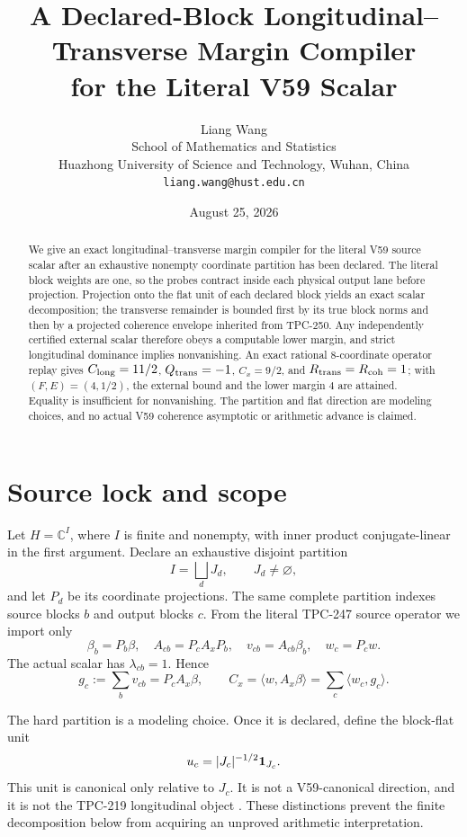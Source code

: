 \documentclass[10pt]{article}
\title{A Declared-Block Longitudinal--Transverse Margin Compiler\\
for the Literal V59 Scalar}
\author{Liang Wang\\
School of Mathematics and Statistics\\
Huazhong University of Science and Technology, Wuhan, China\\
\texttt{liang.wang@hust.edu.cn}}
\date{August 25, 2026}
\newcommand{\C}{\mathbb{C}}
\newcommand{\ip}[2]{\langle #1,#2\rangle}
\begin{document}
\maketitle

\begin{abstract}
We give an exact longitudinal--transverse margin compiler for the literal V59
source scalar after an exhaustive nonempty coordinate partition has been
declared.  The literal block weights are one, so the probes contract inside
each physical output lane before projection.  Projection onto the flat unit
of each declared block yields an exact scalar decomposition; the transverse
remainder is bounded first by its true block norms and then by a projected
coherence envelope inherited from TPC-250.  Any independently certified
external scalar therefore obeys a computable lower margin, and strict
longitudinal dominance implies nonvanishing.  An exact rational
$8$-coordinate operator replay gives
$C_{\rm long}=11/2$, $Q_{\rm trans}=-1$, $C_x=9/2$, and
$R_{\rm trans}=R_{\rm coh}=1$; with $(F,E)=(4,1/2)$, the external bound and
the lower margin $4$ are attained.  Equality is insufficient for
nonvanishing.  The partition and flat direction are modeling choices, and no
actual V59 coherence asymptotic or arithmetic advance is claimed.
\end{abstract}

\section{Source lock and scope}

Let $H=\C^I$, where $I$ is finite and nonempty, with inner product
conjugate-linear in the first argument.  Declare an exhaustive disjoint
partition
\[
 I=\bigsqcup_d J_d, \qquad J_d\ne\varnothing,
\]
and let $P_d$ be its coordinate projections.  The same complete partition
indexes source blocks $b$ and output blocks $c$.  From the literal TPC-247
source operator we import only \cite{tpc247}
\[
 \beta_b=P_b\beta,\quad A_{cb}=P_cA_xP_b,\quad
 v_{cb}=A_{cb}\beta_b,\quad w_c=P_cw.
\]
The actual scalar has $\lambda_{cb}=1$.  Hence
\begin{equation}\label{eq:literal}
 g_c:=\sum_bv_{cb}=P_cA_x\beta,
 \qquad C_x=\ip{w}{A_x\beta}=\sum_c\ip{w_c}{g_c}.
\end{equation}

The hard partition is a modeling choice.  Once it is declared, define the
block-flat unit
\[
 u_c=|J_c|^{-1/2}{\bf 1}_{J_c}.
\]
This unit is canonical only relative to $J_c$.  It is not a V59-canonical
direction, and it is not the TPC-219 longitudinal object \cite{tpc219}.
These distinctions prevent the finite decomposition below from acquiring an
unproved arithmetic interpretation.
\end{document}
